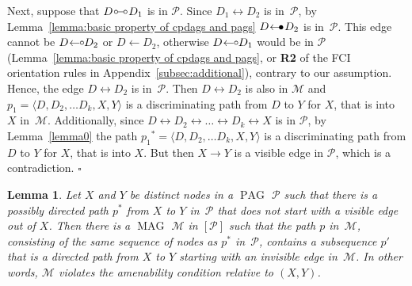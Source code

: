 \documentclass[11pt,a4paper]{article}
\newtheorem{lemma}[definition]{Lemma}
\newenvironment{proofof}[1][]{\begin{trivlist}
   \item[\hskip \labelsep {\bfseries Proof of #1.}]}{\hfill{}$\square$\end{trivlist}}
\DeclareMathOperator{\MAG}{MAG}
\DeclareMathOperator{\PAG}{PAG}
\newcommand{\amen}{the amenability condition\xspace}
\newcommand{\g}[1][G]{\mathcal{#1}}
\newcommand{\pstar}[1][p]{{#1}^{*}}
\newcommand{\arrowbullet}{
  \setlength{\unitlength}{1mm}
  \begin{picture}(5,1)(0,0)
    \put(0.2,0){$\leftarrow$}
    \put(3,0){$\bullet$}
  \end{picture}
}
\newcommand{\arrowcirc}{
  \setlength{\unitlength}{1mm}
  \begin{picture}(5,1)(0,0)
    \put(0.2,0){$\leftarrow$}
    \put(4.3,1){\circle{1}}
  \end{picture}
}
\newcommand{\circcirc}{
  \setlength{\unitlength}{1mm}
  \begin{picture}(5,1)(0,0)
    \put(1,1){\circle{1}}
    \put(1.5,1){\line(1,0){2}}
    \put(4,1){\circle{1}}
  \end{picture}
}
\begin{document}
\begin{proofof}[Lemma~\ref{lemma:stays_invisible}]
Next, suppose that $D \circcirc D_1$ is in $\g[P]$.
Since $D_1 \leftrightarrow D_2$ is in~$\g[P]$, by Lemma~\ref{lemma:basic property of cpdags and pags}
$D \arrowbullet D_2$ is in~$\g[P]$. This edge cannot be $D \arrowcirc D_2$ or $D \leftarrow D_2$, otherwise $D \arrowcirc D_1$ would be in $\g[P]$ (Lemma~\ref{lemma:basic property of cpdags and pags}, or \textbf{R2} of the FCI orientation rules in Appendix~\ref{subsec:additional}), contrary to our assumption.
Hence, the edge $D \leftrightarrow D_2$ is in~$\g[P]$. Then $D \leftrightarrow D_2$ is also in $\g[M]$ and $p_1  = \langle D, D_2,\dots D_k, X, Y \rangle$ is a discriminating path from $D$ to $Y$ for $X$, that is into $X$ in~$\g[M]$. Additionally, since $D \leftrightarrow D_2 \leftrightarrow \dots \leftrightarrow D_k \leftrightarrow X$ is in $\g[P]$, by Lemma~\ref{lemma0} the path $\pstar[p_1] =  \langle D, D_2,\dots D_k, X, Y \rangle$ is a discriminating path from $D$ to $Y$ for $X$, that is into $X$. But then $X \rightarrow Y$ is a visible edge in $\g[P]$, which is a contradiction.
\end{proofof}


\begin{lemma}
Let $X$ and $Y$ be distinct nodes in a $\PAG$ $\g[P]$ such that there is a possibly directed path $\pstar$ from $X$ to $Y$ in~$\g[P]$ that does not start with a visible edge out of $X$. Then there is a $\MAG$ $\g[M]$ in $[\g[P]]$ such that the path $p$ in~$\g[M]$, consisting of the same sequence of nodes as $\pstar$ in~$\g[P]$, contains a subsequence $p'$ that is a directed path from $X$ to $Y$ starting with an invisible edge in~$\g[M]$. In other words, $\g[M]$ violates \amen{} relative to $({X,Y})$.
    \label{lemmadirectedpath}
\end{lemma}
\end{document}
